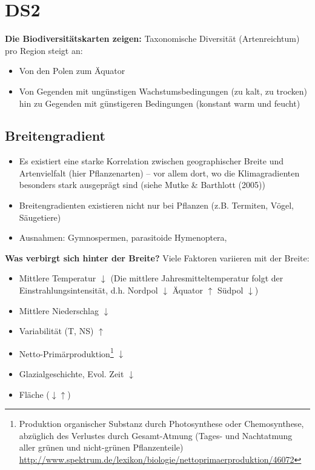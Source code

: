 \section{DS2}
\textbf{Die Biodiversitätskarten zeigen:} Taxonomische Diversität (Artenreichtum) pro Region steigt an:
\begin{itemize}
	\item Von den Polen zum Äquator
	\item Von Gegenden mit ungünstigen Wachstumsbedingungen (zu kalt, zu trocken) hin zu Gegenden mit günstigeren Bedingungen (konstant warm und feucht)
\end{itemize}

\subsection{Breitengradient}
\begin{itemize}
	\item Es existiert eine starke Korrelation zwischen geographischer Breite und Artenvielfalt (hier Pflanzenarten) – vor allem dort, wo die Klimagradienten besonders stark ausgeprägt sind (siehe Mutke \& Barthlott (2005))
	\item Breitengradienten existieren nicht nur bei Pflanzen (z.B. Termiten, Vögel, Säugetiere)
	\item Ausnahmen: Gymnospermen, parasitoide Hymenoptera, 
\end{itemize}

\textbf{Was verbirgt sich hinter der Breite?} Viele Faktoren variieren mit der Breite:
\begin{itemize}
	\item Mittlere Temperatur $\downarrow$ (Die mittlere Jahresmitteltemperatur folgt der Einstrahlungsintensität, d.h. Nordpol $\downarrow$ Äquator $\uparrow$ Südpol $\downarrow$)
	\item Mittlere Niederschlag $\downarrow$
	\item Variabilität (T, NS) $\uparrow$
	\item Netto-Primärproduktion\footnote{Produktion organischer Substanz durch Photosynthese oder Chemosynthese, abzüglich des Verlustes durch Gesamt-Atmung (Tages- und Nachtatmung aller grünen und nicht-grünen Pflanzenteile) \\ \url{http://www.spektrum.de/lexikon/biologie/nettoprimaerproduktion/46072}} $\downarrow$
	\item Glazialgeschichte, Evol. Zeit $\downarrow$
	\item Fläche ($\downarrow \uparrow$)
\end{itemize}

